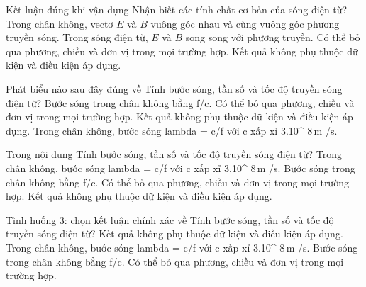 \begin{ex}
Kết luận đúng khi vận dụng Nhận biết các tính chất cơ bản của sóng điện từ?
\choice
{\True Trong chân không, vectơ $E$ và $B$ vuông góc nhau và cùng vuông góc phương truyền sóng.}
{Trong sóng điện từ, $E$ và $B$ song song với phương truyền.}
{Có thể bỏ qua phương, chiều và đơn vị trong mọi trường hợp.}
{Kết quả không phụ thuộc dữ kiện và điều kiện áp dụng.}
\end{ex}

\begin{ex}
Phát biểu nào sau đây đúng về Tính bước sóng, tần số và tốc độ truyền sóng điện từ?
\choice
{Bước sóng trong chân không bằng f/c.}
{Có thể bỏ qua phương, chiều và đơn vị trong mọi trường hợp.}
{Kết quả không phụ thuộc dữ kiện và điều kiện áp dụng.}
{\True Trong chân không, bước sóng lambda = c/f với c xấp xỉ 3.10^ $8\,\text{m}$ /s.}
\end{ex}

\begin{ex}
Trong nội dung Tính bước sóng, tần số và tốc độ truyền sóng điện từ?
\choice
{\True Trong chân không, bước sóng lambda = c/f với c xấp xỉ 3.10^ $8\,\text{m}$ /s.}
{Bước sóng trong chân không bằng f/c.}
{Có thể bỏ qua phương, chiều và đơn vị trong mọi trường hợp.}
{Kết quả không phụ thuộc dữ kiện và điều kiện áp dụng.}
\end{ex}

\begin{ex}
Tình huống 3: chọn kết luận chính xác về Tính bước sóng, tần số và tốc độ truyền sóng điện từ?
\choice
{Kết quả không phụ thuộc dữ kiện và điều kiện áp dụng.}
{\True Trong chân không, bước sóng lambda = c/f với c xấp xỉ 3.10^ $8\,\text{m}$ /s.}
{Bước sóng trong chân không bằng f/c.}
{Có thể bỏ qua phương, chiều và đơn vị trong mọi trường hợp.}
\end{ex}

